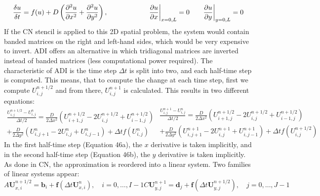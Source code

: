 \begin{equation}
    \frac{\delta u}{\delta t} =  f(u) + D\left(\frac{\partial^{2} {u}}{\partial {x}^{2}} + \frac{\partial^{2} {u}}{\partial {y}^{2}}\right) ,   \quad \quad \quad \quad \quad \quad \pdv{u}{x}\biggr\rvert_{x=0,L}=0 \quad \quad \pdv{u}{y}\biggr\rvert_{y=0,L}=0
\end{equation}
If the CN stencil is applied to this 2D spatial problem, the system would contain banded matrices on the right and left-hand sides, which would be very expensive to invert. \acrshort{ADI} offers an alternative in which tridiagonal matrices are inverted instead of banded matrices (less computational power required). The characteristic of \acrshort{ADI} is the time step $\Delta t$ is split into two, and each half-time step is computed. This means, that to compute the change at each time step, first we compute $U^{n+1/2}_{i,j} $ and from there,    $U^{n+1}_{i,j} $ is calculated. This results in two different equations:
\begin{subequations}
    \begin{equation}
        \begin{split}
            \frac{U^{n+1/2}_{i,j} - U^{n}_{i,j}}{\Delta t/2} = \frac{D}{2\Delta x^{2}}\left( U^{n+1/2}_{i+1,j} -  2U^{n+1/2}_{i,j} + U^{n+1/2}_{i-1,j}\right)  \\+ \frac{D}{2\Delta y^{2}}\left( U^{n}_{i,j+1} -  2U^{n}_{i,j} + U^{n}_{i,j-1}\right)  + \Delta t f(U^{n}_{i,j})
        \end{split}
    \end{equation}
    \begin{equation}
        \begin{split}
            \frac{U^{n+1}_{i,j} - U^{n}_{i,j}}{\Delta t/2} = \frac{D}{2\Delta x^{2}}\left( U^{n+1/2}_{i+1,j} -  2U^{n+1/2}_{i,j} + U^{n+1/2}_{i-1,j}\right)  \\+ \frac{D}{2\Delta y^{2}}\left( U^{n+1}_{i,j+1} -  2U^{n+1}_{i,j} + U^{n+1}_{i,j-1}\right)  + \Delta t f(U^{n+1/2}_{i,j})
        \end{split}
    \end{equation}
\end{subequations}
In the first half-time step (Equation 46a), the $x$ derivative is taken implicitly, and in the second half-time step (Equation 46b), the $y$ derivative is taken implicitly. As done in \acrshort{CN}, the approximation is reordered into a linear system. Two families of linear systems appear:
\begin{subequations}
    \begin{equation}
        A\textbf{U}^{n+1/2}_{x,i} = \textbf{b}_{i} + \textbf{f}(\Delta t \textbf{U}^{n}_{x,i}), \quad i=0,\ldots,I-1
    \end{equation}
    \begin{equation}
        C\textbf{U}^{n+1}_{y,j} = \textbf{d}_{j} + \textbf{f}(\Delta t \textbf{U}^{n+1/2}_{y,j}), \quad j=0,\ldots,J-1
    \end{equation}
\end{subequations}
